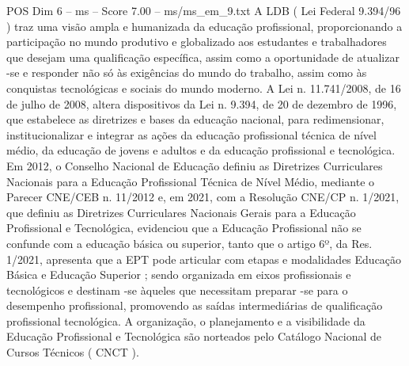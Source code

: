 \begin{textsample}{POS Dim 6 – ms – Score 7.00 – ms/ms\_em\_9.txt}
A LDB ( Lei Federal 9.394/96 ) traz uma visão ampla e humanizada da educação profissional, proporcionando a participação no mundo produtivo e globalizado aos estudantes e trabalhadores que desejam uma qualificação específica, assim como a oportunidade de atualizar -se e responder não só às exigências do mundo do trabalho, assim como às conquistas tecnológicas e sociais do mundo moderno.
A Lei n. 11.741/2008, de 16 de julho de 2008, altera dispositivos da Lei n. 9.394, de 20 de dezembro de 1996, que estabelece as diretrizes e bases da educação nacional, para redimensionar, institucionalizar e integrar as ações da educação profissional técnica de nível médio, da educação de jovens e adultos e da educação profissional e tecnológica.
Em 2012, o Conselho Nacional de Educação definiu as Diretrizes Curriculares Nacionais para a Educação Profissional Técnica de Nível Médio, mediante o Parecer CNE/CEB n. 11/2012 e, em 2021, com a Resolução CNE/CP n. 1/2021, que definiu as Diretrizes Curriculares Nacionais Gerais para a Educação Profissional e Tecnológica, evidenciou que a Educação Profissional não se confunde com a educação básica ou superior, tanto que o artigo 6º, da Res. 1/2021, apresenta que a EPT pode articular com etapas e modalidades Educação Básica e Educação Superior ; sendo organizada em eixos profissionais e tecnológicos e destinam -se àqueles que necessitam preparar -se para o desempenho profissional, promovendo as saídas intermediárias de qualificação profissional tecnológica.
A organização, o planejamento e a visibilidade da Educação Profissional e Tecnológica são norteados pelo Catálogo Nacional de Cursos Técnicos ( CNCT ).

\end{textsample}
